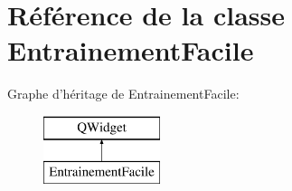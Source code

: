 \section{Référence de la classe Entrainement\-Facile}
\label{class_entrainement_facile}
Graphe d'héritage de Entrainement\-Facile\-:\begin{figure}[H]
\begin{center}
\leavevmode
\includegraphics[height=2.000000cm]{class_entrainement_facile}
\end{center}
\end{figure}
